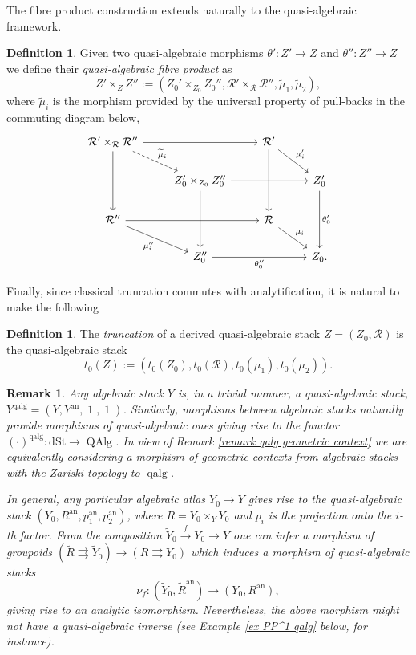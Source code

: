 \documentclass[11pt, a4paper]{amsart}
\numberwithin{equation}{section}
\newtheorem{remark}[theorem]{Remark}
\theoremstyle{definition}
\newtheorem{definition}[theorem]{Definition}
\theoremstyle{remark}
\DeclareMathOperator{\id}{1}
\DeclareMathOperator{\an}{an}
\DeclareMathOperator{\qalg}{\mathrm{qalg}}
\DeclareMathOperator{\QAlg}{\mathrm{QAlg}}
\newcommand{\Rr}{\mathcal{R}}
\newcommand{\wt}[1]{\widetilde{#1}}
\renewcommand{\to}{\longrightarrow}
\begin{document}
The fibre product construction extends naturally to the quasi-algebraic framework. 
\begin{definition}
Given two quasi-algebraic morphisms $\theta': Z' \to Z$ and $\theta'' : Z'' \to Z$ we define their {\it quasi-algebraic fibre product} as 
\[
Z' \times_{Z} Z'' := \left ( Z_0' \times_{Z_0} Z_0'', \Rr' \times_{\Rr} \Rr'', \wt \mu_1 , \wt \mu_2 \right ), 
\]
where $\wt \mu_i$ is the morphism provided by the universal property of pull-backs in the commuting diagram below,
\[
\begin{tikzcd}
\Rr' \times_{\Rr} \Rr'' & & \Rr' &
\\
 & Z_0' \times_{Z_0} Z_0'' & & Z_0'
\\
\Rr'' & & \Rr &
\\
 & Z_0'' & & Z_0 .
\arrow[from=1-1, to=1-3]
\arrow[from=1-1, to=3-1]
\arrow[from=1-3, to=3-3]
\arrow[from=3-1, to=3-3]
\arrow[from=2-2, to=2-4]
\arrow[from=2-2, to=4-2]
\arrow[from=2-4, to=4-4, "\theta_0'"]
\arrow[from=4-2, to=4-4, "\theta_0''"']
\arrow[from=1-1, to=2-2, dashed, "\wt \mu_i"]
\arrow[from=1-3, to=2-4, "\mu_i'"]
\arrow[from=3-1, to=4-2, "\mu_i''"']
\arrow[from=3-3, to=4-4, "\mu_i"]
\end{tikzcd}
\]
\end{definition}



Finally, since classical truncation commutes with analytification, it is natural to make the following
\begin{definition}
The {\it truncation} of a derived quasi-algebraic stack $Z = (Z_0, \Rr)$ is the quasi-algebraic stack 
\[
t_0(Z) := \left ( t_0(Z_0), t_0(\Rr),  t_0(\mu_1), t_0(\mu_2) \right ). 
\]
\end{definition} 


\begin{remark} \label{rm Alg to QAlg}
Any algebraic stack $Y$ is, in a trivial manner, a quasi-algebraic stack, $Y^{\qalg}=(Y, Y^{\an}, \id, \id)$. Similarly, morphisms between algebraic stacks naturally provide morphisms of quasi-algebraic ones giving rise to the functor $(\cdot)^{\qalg} : \mathrm{dSt} \to \QAlg$. In view of Remark \ref{remark qalg geometric context} we are equivalently considering a morphism of geometric contexts from algebraic stacks with the Zariski topology to $\qalg$.

In general, any particular algebraic atlas $Y_0 \to Y$ gives rise to the quasi-algebraic stack $(Y_0, R^{\an}, p_1^{\an}, p_2^{\an} )$, where $R = Y_0 \times_Y Y_0$ and $p_i$ is the projection onto the $i$-th factor. From the composition $\wt Y_0 \stackrel{f}{\to} Y_0 \to Y$ one can infer a morphism of groupoids $(\wt R \rightrightarrows \wt Y_0) \to (R \rightrightarrows Y_0)$ which induces a morphism of quasi-algebraic stacks 
\[
\nu_f : (\wt Y_0, \wt R^{\an}) \to (Y_0, R^{\an}),
\]
giving rise to an analytic isomorphism. Nevertheless, the above morphism might not have a quasi-algebraic inverse (see Example \ref{ex PP^1 qalg} below, for instance).
\end{remark}
\end{document}
